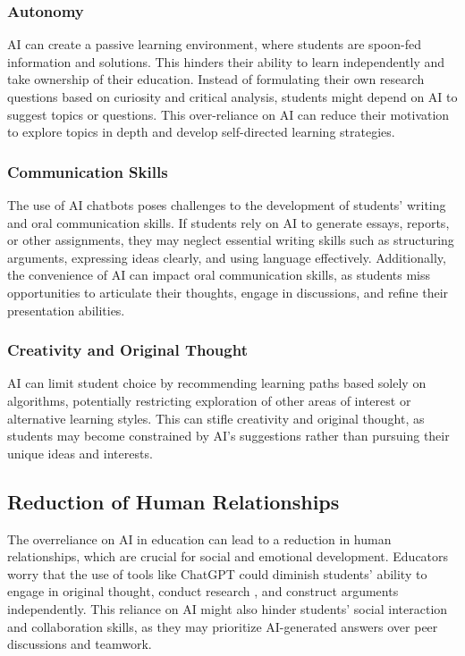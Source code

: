 \documentclass{article}
\begin{document}
\subsubsection{Autonomy}

AI can create a passive learning environment, where students are
spoon-fed information and solutions. This hinders their ability
to learn independently and take ownership of their education.
Instead of formulating their own research questions based on
curiosity and critical analysis, students might depend on AI
to suggest topics or questions. This over-reliance on AI can
reduce their motivation to explore topics in depth and develop
self-directed learning strategies.

\subsubsection{Communication Skills}

The use of AI chatbots poses challenges to the development of students'
writing and oral communication skills. If students rely on AI to generate
essays, reports, or other assignments, they may neglect essential
writing skills such as structuring arguments,
expressing ideas clearly, and using language effectively. Additionally,
the convenience of AI can impact oral communication skills,
as students miss opportunities to articulate their thoughts,
engage in discussions, and refine their presentation abilities.

\subsubsection{Creativity and Original Thought}

AI can limit student choice by recommending learning paths based
solely on algorithms, potentially restricting exploration of other
areas of interest or alternative learning styles. This can stifle
creativity and original thought, as students may become constrained by AI's
suggestions rather than pursuing their unique ideas and interests.

\subsection{Reduction of Human Relationships}

The overreliance on AI in education can lead to a reduction in human
relationships, which are crucial for social and emotional development.
Educators worry that the use of tools like ChatGPT could diminish
students' ability to engage in original thought, conduct research
, and construct arguments independently. This reliance on AI might also hinder
students' social interaction and collaboration skills,
as they may prioritize AI-generated answers over peer discussions and teamwork.
\end{document}

